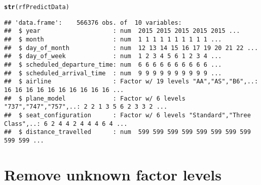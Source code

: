 \documentclass{article}\usepackage[]{graphicx}\usepackage[]{color}
\makeatletter
\newcommand{\hlstd}[1]{\textcolor[rgb]{0.345,0.345,0.345}{#1}}%
\newcommand{\hlkwd}[1]{\textcolor[rgb]{0.737,0.353,0.396}{\textbf{#1}}}%
\newenvironment{kframe}{%
 \def\at@end@of@kframe{}%
 \ifinner\ifhmode%
  \def\at@end@of@kframe{\end{minipage}}%
  \begin{minipage}{\columnwidth}%
 \fi\fi%
 \def\FrameCommand##1{\hskip\@totalleftmargin \hskip-\fboxsep
 \colorbox{shadecolor}{##1}\hskip-\fboxsep
     \hskip-\linewidth \hskip-\@totalleftmargin \hskip\columnwidth}%
 \MakeFramed {\advance\hsize-\width
   \@totalleftmargin\z@ \linewidth\hsize
   \@setminipage}}%
 {\par\unskip\endMakeFramed%
 \at@end@of@kframe}
\newenvironment{knitrout}{}{} %
\makeatother
\begin{document}
\begin{knitrout}
\color{fgcolor}\begin{kframe}
\begin{alltt}
\hlkwd{str}\hlstd{(rfPredictData)}
\end{alltt}
\begin{verbatim}
## 'data.frame':	566376 obs. of  10 variables:
##  $ year                    : num  2015 2015 2015 2015 2015 ...
##  $ month                   : num  1 1 1 1 1 1 1 1 1 1 ...
##  $ day_of_month            : num  12 13 14 15 16 17 19 20 21 22 ...
##  $ day_of_week             : num  1 2 3 4 5 6 1 2 3 4 ...
##  $ scheduled_departure_time: num  6 6 6 6 6 6 6 6 6 6 ...
##  $ scheduled_arrival_time  : num  9 9 9 9 9 9 9 9 9 9 ...
##  $ airline                 : Factor w/ 19 levels "AA","AS","B6",..: 16 16 16 16 16 16 16 16 16 16 ...
##  $ plane_model             : Factor w/ 6 levels "737","747","757",..: 2 2 1 3 5 6 2 3 3 2 ...
##  $ seat_configuration      : Factor w/ 6 levels "Standard","Three Class",..: 6 2 4 4 2 4 4 4 6 4 ...
##  $ distance_travelled      : num  599 599 599 599 599 599 599 599 599 599 ...
\end{verbatim}
\end{kframe}
\end{knitrout}

\section{Remove unknown factor levels}
\end{document}
